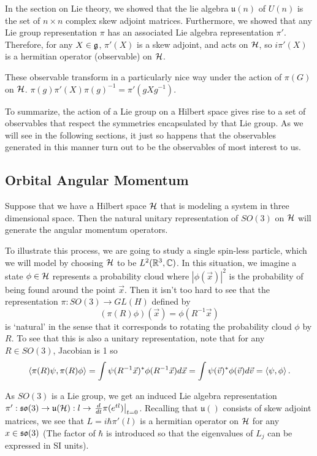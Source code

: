 \documentclass[a4paper]{article}
\begin{document}
In the section on Lie theory, we showed that the lie algebra $\mathfrak{u}(n)$ of $U(n)$ is the set of $n \times n$ complex skew adjoint matrices. Furthermore, we showed that any Lie group representation $\pi$ has an associated Lie algebra representation $\pi'$. Therefore, for any $X \in \mathfrak{g}$, $\pi'(X)$ is a skew adjoint, and acts on $\mathcal{H}$, so $i\pi'(X)$ is a hermitian operator (observable) on $\mathcal{H}$. 

These observable transform in a particularly nice way under the action of $\pi(G)$ on $\mathcal{H}$. $\pi(g)\pi'(X)\pi(g)^{-1} = \pi'(gXg^{-1})$.

To summarize, the action of a Lie group on a Hilbert space gives rise to a set of observables that respect the symmetries encapsulated by that Lie group. As we will see in the following sections, it just so happens that the observables generated in this manner turn out to be the observables of most interest to us.

\subsection{Orbital Angular Momentum}
Suppose that we have a Hilbert space $\mathcal{H}$ that is modeling a system in three dimensional space. Then the natural unitary representation of $SO(3)$ on $\mathcal{H}$ will generate the angular momentum operators. 

To illustrate this process, we are going to study a single spin-less particle, which we will model by choosing $\mathcal{H}$ to be $L^2(\mathbb{R}^3, \mathbb{C})$. In this situation, we imagine a state $\phi \in \mathcal{H}$ represents a probability cloud where $|\phi(\vec{x})|^2$ is the probability of being found around the point $\vec{x}$. Then it isn't too hard to see that the representation $\pi : SO(3) \to GL(H)$ defined by
$$(\pi(R)\phi)(\vec{x}) = \phi(R^{-1}\vec{x})$$
is `natural' in the sense that it corresponds to rotating the probability cloud $\phi$ by $R$. To see that this is also a unitary representation, note that for any $R \in SO(3)$, Jacobian is 1 so 
$$\left\langle \pi(R)\psi , \pi(R)\phi \right\rangle = \int \psi(R^{-1}\vec{x})^* \phi(R^{-1}\vec{x})d\vec{x} = \int \psi(\vec{v})^* \phi(\vec{v})d\vec{v} = \left\langle \psi , \phi \right\rangle.$$

As $SO(3)$ is a Lie group, we get an induced Lie algebra representation $\pi' : \mathfrak{so}(3) \to \mathfrak{u}(\mathcal{H}) : l \to \left. \frac{d}{dt}\pi(e^{tl})\right|_{t=0}$. Recalling that $\mathfrak{u}()$ consists of skew adjoint matrices, we see that $L = i\hbar\pi'(l)$ is a hermitian operator on $\mathcal{H}$ for any $x \in \mathfrak{so}(3)$ (The factor of $\hbar$ is introduced so that the eigenvalues of $L_j$ can be expressed in SI units). 
\end{document}
